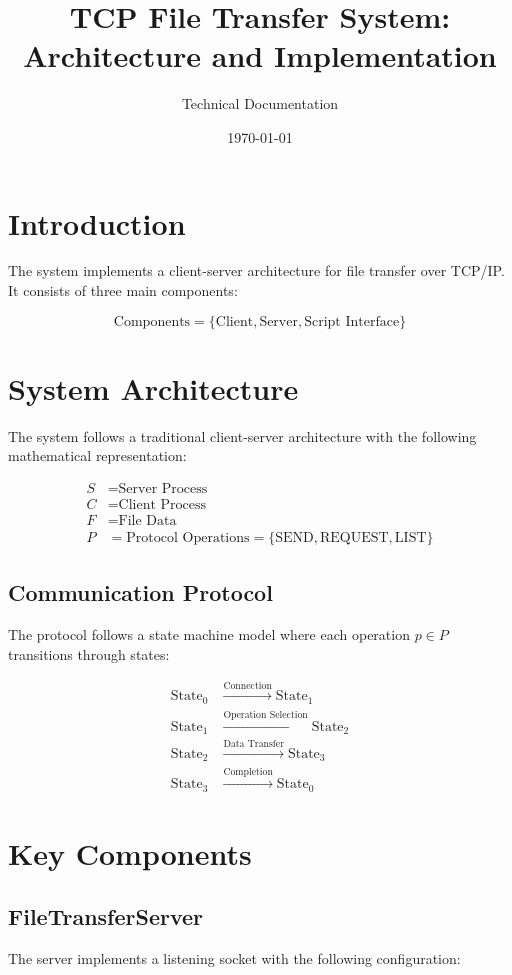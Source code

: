 \documentclass{article}
\title{TCP File Transfer System: Architecture and Implementation}
\author{Technical Documentation}
\date{\today}
\begin{document}
\maketitle

\section{Introduction}
The system implements a client-server architecture for file transfer over TCP/IP. It consists of three main components:

\[
\text{Components} = \{\text{Client}, \text{Server}, \text{Script Interface}\}
\]

\section{System Architecture}
The system follows a traditional client-server architecture with the following mathematical representation:

\begin{align*}
S &= \text{Server Process} \\
C &= \text{Client Process} \\
F &= \text{File Data} \\
P &= \text{Protocol Operations} = \{\text{SEND}, \text{REQUEST}, \text{LIST}\}
\end{align*}

\subsection{Communication Protocol}
The protocol follows a state machine model where each operation $p \in P$ transitions through states:

\begin{align*}
\text{State}_0 &\xrightarrow{\text{Connection}} \text{State}_1 \\
\text{State}_1 &\xrightarrow{\text{Operation Selection}} \text{State}_2 \\
\text{State}_2 &\xrightarrow{\text{Data Transfer}} \text{State}_3 \\
\text{State}_3 &\xrightarrow{\text{Completion}} \text{State}_0
\end{align*}

\section{Key Components}

\subsection{FileTransferServer}
The server implements a listening socket with the following configuration:
\end{document}
